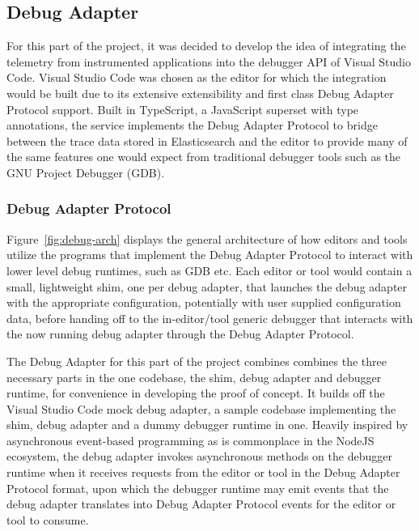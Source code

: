 \documentclass[12pt,pdftex,titlepage]{report}
\begin{document}
            \subsection{Debug Adapter}
                For this part of the project, it was decided to develop the idea of integrating the telemetry from instrumented applications into the debugger API of Visual Studio Code.
                Visual Studio Code was chosen as the editor for which the integration would be built due to its extensive extensibility and first class Debug Adapter Protocol support. 
                Built in TypeScript, a JavaScript superset with type annotations, the service implements the Debug Adapter Protocol to bridge between the trace data stored in Elasticsearch
                and the editor to provide many of the same features one would expect from traditional debugger tools such as the GNU Project Debugger (GDB).

                \subsubsection{Debug Adapter Protocol}
                    Figure~\ref{fig:debug-arch} displays the general architecture of how editors and tools utilize the programs that implement the Debug Adapter Protocol to interact with
                    lower level debug runtimes, such as GDB etc. Each editor or tool would contain a small, lightweight shim, one per debug adapter, that launches the debug adapter with the
                    appropriate configuration, potentially with user supplied configuration data, before handing off to the in-editor/tool generic debugger that interacts with the now running
                    debug adapter through the Debug Adapter Protocol.

                    The Debug Adapter for this part of the project combines combines the three necessary parts in the one codebase, the shim, debug adapter and debugger runtime, for convenience
                    in developing the proof of concept. It builds off the Visual Studio Code mock debug adapter\cite{mockdebug}, a sample codebase implementing the shim, debug adapter and a dummy debugger
                    runtime in one. Heavily inspired by asynchronous event-based programming as is commonplace in the NodeJS ecosystem, the debug adapter invokes asynchronous methods on the 
                    debugger runtime when it receives requests from the editor or tool in the Debug Adapter Protocol format, upon which the debugger runtime may emit events that the debug adapter
                    translates into Debug Adapter Protocol events for the editor or tool to consume.
\end{document}
